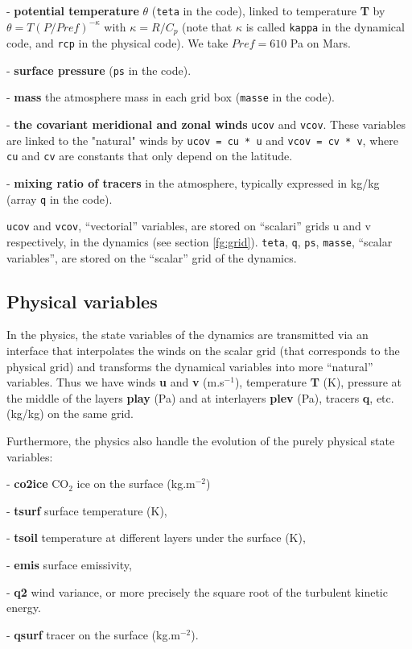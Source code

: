 \begin{description}
\item - {\bf potential temperature} $\theta$ ({\tt teta} in the code),
linked to temperature {\bf T} by $\theta = T{(P/Pref)}^{-\kappa}$
with $\kappa = R/C_p$
(note that $\kappa$ is called {\tt kappa} in the dynamical code, and {\tt rcp}
in the physical code). We take $Pref=610$ Pa on  Mars.
\item - {\bf surface pressure} ({\tt ps} in the code).
\item - {\bf mass} the atmosphere mass in each grid box ({\tt masse}
in the code).
\item - {\bf the covariant meridional and zonal winds}
{\tt ucov} and {\tt vcov}.
These variables are linked to the "natural" winds by
\verb+ucov = cu * u+ and \verb+vcov = cv * v+, where
\verb+cu+ and \verb+cv+ are constants that only depend on the latitude.
\item - {\bf mixing ratio of tracers} in the atmosphere, typically
expressed in kg/kg (array {\tt q} in the code).
\end{description} 

{\tt ucov} and {\tt vcov}, ``vectorial'' variables, are stored on
``scalari'' grids u and v respectively, in the dynamics
(see section \ref{fg:grid}).
{\tt teta}, {\tt q}, {\tt ps}, {\tt masse}, ``scalar variables'',
are stored on the ``scalar'' grid of the dynamics.



\subsection{Physical variables}

In the physics, the state variables of the dynamics are transmitted
via an interface that interpolates the winds on the scalar grid
(that corresponds to the physical grid) and transforms the dynamical variables
into more ``natural'' variables.
Thus we have winds {\bf u} and  {\bf v} (m.s$^{-1}$),
temperature {\bf T} (K), pressure at the middle of the layers 
{\bf play} (Pa) and at interlayers {\bf plev} (Pa), tracers
{\bf q}, etc. (kg/kg) on the same grid.

Furthermore, the physics also handle the evolution of the purely
physical state variables:
\begin{description}
\item - {\bf co2ice} CO$_2$ ice on the surface (kg.m$^{-2}$)
\item - {\bf tsurf} surface temperature (K),
\item - {\bf tsoil} temperature at different layers under the surface (K),
\item - {\bf emis} surface emissivity,
\item - {\bf q2} wind variance, or more precisely the square root of
the turbulent kinetic energy.
\item - {\bf qsurf} tracer on the surface (kg.m$^{-2}$).
\end{description}

